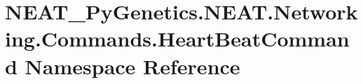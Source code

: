 \hypertarget{namespaceNEAT__PyGenetics_1_1NEAT_1_1Networking_1_1Commands_1_1HeartBeatCommand}{}\section{N\+E\+A\+T\+\_\+\+Py\+Genetics.\+N\+E\+A\+T.\+Networking.\+Commands.\+Heart\+Beat\+Command Namespace Reference}
\label{namespaceNEAT__PyGenetics_1_1NEAT_1_1Networking_1_1Commands_1_1HeartBeatCommand}

